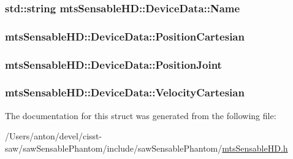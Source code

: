 \subsubsection[{Name}]{\setlength{\rightskip}{0pt plus 5cm}std\+::string mts\+Sensable\+H\+D\+::\+Device\+Data\+::\+Name}\label{structmts_sensable_h_d_1_1_device_data_aa1b15a9026612af14c0b37cca2deb4f2}
\hypertarget{structmts_sensable_h_d_1_1_device_data_a4d969029290b854322a3c4f4f94e37c8}{}
\subsubsection[{Position\+Cartesian}]{ mts\+Sensable\+H\+D\+::\+Device\+Data\+::\+Position\+Cartesian}\label{structmts_sensable_h_d_1_1_device_data_a4d969029290b854322a3c4f4f94e37c8}
\hypertarget{structmts_sensable_h_d_1_1_device_data_a3c3a873384119db3e76de8b622240193}{}
\subsubsection[{Position\+Joint}]{ mts\+Sensable\+H\+D\+::\+Device\+Data\+::\+Position\+Joint}\label{structmts_sensable_h_d_1_1_device_data_a3c3a873384119db3e76de8b622240193}
\hypertarget{structmts_sensable_h_d_1_1_device_data_a2878f540b39f0f5bce4ad8e82f446fdf}{}
\subsubsection[{Velocity\+Cartesian}]{ mts\+Sensable\+H\+D\+::\+Device\+Data\+::\+Velocity\+Cartesian}\label{structmts_sensable_h_d_1_1_device_data_a2878f540b39f0f5bce4ad8e82f446fdf}


The documentation for this struct was generated from the following file\+:\begin{DoxyCompactItemize}
\item 
/\+Users/anton/devel/cisst-\/saw/saw\+Sensable\+Phantom/include/saw\+Sensable\+Phantom/\hyperlink{mts_sensable_h_d_8h}{mts\+Sensable\+H\+D.\+h}\end{DoxyCompactItemize}
